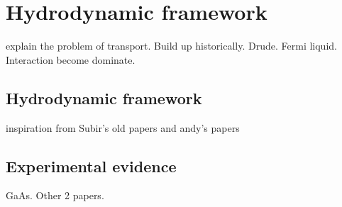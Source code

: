 \chapter{Hydrodynamic framework}
\label{Ch:hydrodynamic_framework}

explain the problem of transport. Build up historically. Drude. Fermi liquid. Interaction become dominate.

\section{Hydrodynamic framework}
inspiration from Subir’s old papers and andy’s papers

\section{Experimental evidence}
GaAs. Other 2 papers.